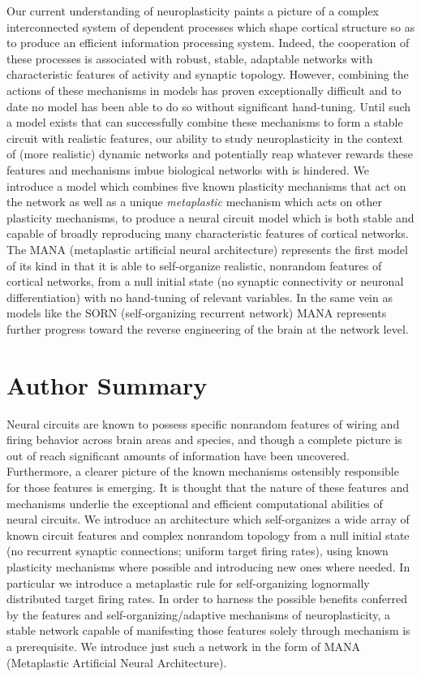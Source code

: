 \documentclass[10pt,letterpaper]{article}
\begin{document}
Our current understanding of neuroplasticity paints a picture of a complex interconnected system of dependent processes which shape cortical structure so as to produce an efficient information processing system. Indeed, the cooperation of these processes is associated with robust, stable, adaptable networks with characteristic features of activity and synaptic topology. However, combining the actions of these mechanisms in models has proven exceptionally difficult and to date no model has been able to do so without significant hand-tuning. Until such a model exists that can successfully combine these mechanisms to form a stable circuit with realistic features, our ability to study neuroplasticity in the context of (more realistic) dynamic networks and potentially reap whatever rewards these features and mechanisms imbue biological networks with is hindered. We introduce a model which combines five known plasticity mechanisms that act on the network as well as a unique \emph{metaplastic} mechanism which acts on other plasticity mechanisms, to produce a neural circuit model which is both stable and capable of broadly reproducing many characteristic features of cortical networks. The MANA (metaplastic artificial neural architecture) represents the first model of its kind in that it is able to self-organize realistic, nonrandom features of cortical networks, from a null initial state (no synaptic connectivity  or neuronal differentiation) with no hand-tuning of relevant variables. In the same vein as models like the SORN (self-organizing recurrent network) MANA represents further progress toward the reverse engineering of the brain at the network level. 


\section*{Author Summary}
Neural circuits are known to possess specific nonrandom features of wiring and firing behavior across brain areas and species, and though a complete picture is out of reach significant amounts of information have been uncovered. Furthermore, a clearer picture of the known mechanisms ostensibly responsible for those features is emerging. It is thought that the nature of these features and mechanisms underlie the exceptional and efficient computational abilities of neural circuits. We introduce an architecture which self-organizes a wide array of known circuit features and complex nonrandom topology from a null initial state (no recurrent synaptic connections; uniform target firing rates), using known plasticity mechanisms where possible and introducing new ones where needed. In particular we introduce a metaplastic rule for self-organizing lognormally distributed target firing rates. In order to harness the possible benefits conferred by the features and self-organizing/adaptive mechanisms of neuroplasticity, a stable network capable of manifesting those features solely through mechanism is a prerequisite. We introduce just such a network in the form of MANA (Metaplastic Artificial Neural Architecture). 
\end{document}
